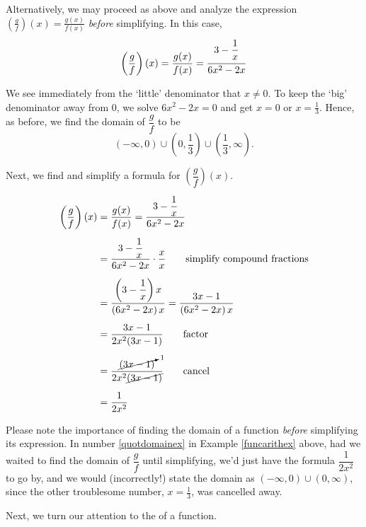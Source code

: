 {\begin{enumerate}
Alternatively, we may proceed as above and analyze the expression $\left(\frac{g}{f}\right)(x) = \frac{g(x)}{f(x)}$ \textit{before} simplifying.  In this case, \[ \left(\dfrac{g}{f}\right)(x) = \dfrac{g(x)}{f(x)}  = \dfrac{3-\dfrac{1}{x}\vphantom{\left(\dfrac{1}{x}\right)}}{6x^2 - 2x}\]

We see immediately from the `little' denominator that $x \neq 0$.  To keep the `big' denominator away from $0$, we solve $6x^2 - 2x = 0$ and get $x = 0$ or $x = \frac{1}{3}$.  Hence, as before, we find the domain of $\dfrac{g}{f}$ to be 
\[
(-\infty, 0) \cup \left(0, \frac{1}{3}\right) \cup \left(\frac{1}{3}, \infty\right).
\]

Next, we find and simplify a formula for $\left(\dfrac{g}{f}\right)(x)$.

\begin{align*} 
\left( \dfrac{g}{f}\right)(x) & = \dfrac{g(x)}{f(x)} = \dfrac{3-\dfrac{1}{x}}{6x^2 - 2x} \\[5pt]
& = \dfrac{3-\dfrac{1}{x}}{6x^2 - 2x} \cdot \dfrac{x}{x} \tag*{simplify compound fractions}  \\[5pt]
& = \dfrac{\left(3-\dfrac{1}{x}\right) x}{\left(6x^2 - 2x\right)x} = \dfrac{3x-1}{\left(6x^2 - 2x\right)x}  \\[5pt]
& = \dfrac{3x-1}{2x^2(3x-1)}  \tag*{factor} \\[5pt]
& = \dfrac{\cancelto{1}{(3x-1)}}{2x^2\cancel{(3x-1)}}  \tag*{cancel} \\[5pt]
& = \dfrac{1}{2x^2}  
\end{align*}
\end{enumerate}
}

\medskip

Please note the importance of finding the domain of a function \textit{before} simplifying its expression.  In number \ref{quotdomainex} in Example \ref{funcarithex} above, had we waited to find the domain of $\dfrac{g}{f}$ until  simplifying, we'd just have the formula $\dfrac{1}{2x^2}$ to go by, and we would (incorrectly!) state the domain as $(-\infty, 0) \cup (0,\infty)$, since the other troublesome number, $x = \frac{1}{3}$, was cancelled away.

Next, we turn our attention to the  of a function.  

\smallskip



